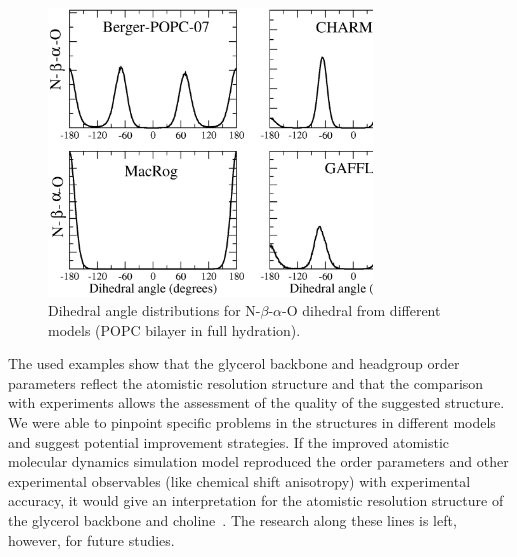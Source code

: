 \documentclass[journal=jacsat,manuscript=article]{achemso}
\begin{document}
\begin{figure}[]
  \centering
  \includegraphics[width=8.6cm]{../Fig/a-bDIHS2.eps}
  \caption{\label{dihDISTS2}
    Dihedral angle distributions for N-$\beta$-$\alpha$-O dihedral from different models (POPC bilayer in full hydration).
  } 
\end{figure}

The used examples show that the glycerol backbone and headgroup order parameters reflect the atomistic resolution structure
and that the comparison with experiments allows the assessment of the quality of the suggested structure. We were able to pinpoint
specific problems in the structures in different models and suggest potential improvement strategies.
If the improved atomistic
molecular dynamics simulation model reproduced the order parameters and other experimental observables (like chemical shift anisotropy)
with experimental accuracy, it would give an interpretation for the atomistic resolution structure of the glycerol backbone and 
choline~\cite{seelig77b,skarjune79,jacobs80,davis83,akutsu91,hong95b,semchyschyn04}. The research along these lines is left, however,
for future studies.
\end{document}
